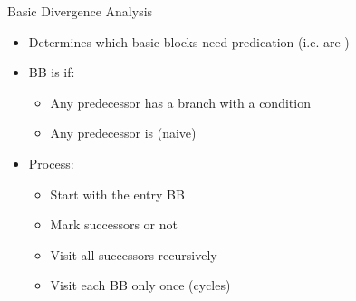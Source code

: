 
\begin{frame}{Basic Divergence Analysis}

\begin{minipage}[t]{0.50\linewidth}

\begin{itemize}
    \item Determines which basic blocks need predication (i.e. are )
    \item BB is  if:
    \begin{itemize}
        \item Any predecessor has a branch with a  condition
        \item Any predecessor is  (naive)
    \end{itemize}
    \item Process:
    \begin{itemize}
        \item Start with the entry BB
        \item Mark successors  or not
        \item Visit all successors recursively
        \item Visit each BB only once (cycles)
    \end{itemize}
\end{itemize}

\end{minipage}
\hspace{1em}
\begin{minipage}[t]{0.43\linewidth}

\vspace{0.1ex}

\end{minipage}

\end{frame}



